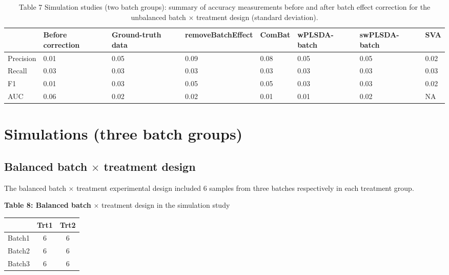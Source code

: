\documentclass[
]{book}
\begin{document}
\begin{table}

\caption{\label{tab:unnamed-chunk-122}Table 7 Simulation studies (two batch groups): summary of accuracy measurements before and after batch effect correction for the unbalanced batch × treatment design (standard deviation).}
\centering
\begin{tabular}[t]{l|l|l|l|l|l|l|l}
\hline
  & Before correction & Ground-truth data & removeBatchEffect & ComBat & wPLSDA-batch & swPLSDA-batch & SVA\\
\hline
Precision & 0.01 & 0.05 & 0.09 & 0.08 & 0.05 & 0.05 & 0.02\\
\hline
Recall & 0.03 & 0.03 & 0.03 & 0.03 & 0.03 & 0.03 & 0.03\\
\hline
F1 & 0.01 & 0.03 & 0.05 & 0.05 & 0.03 & 0.03 & 0.02\\
\hline
AUC & 0.06 & 0.02 & 0.02 & 0.01 & 0.01 & 0.02 & NA\\
\hline
\end{tabular}
\end{table}

\hypertarget{simulations-three-batch-groups}{%
\section{Simulations (three batch groups)}\label{simulations-three-batch-groups}}

\hypertarget{balanced-batch-times-treatment-design-2}{%
\subsection{\texorpdfstring{Balanced batch \(\times\) treatment design}{Balanced batch \textbackslash times treatment design}}\label{balanced-batch-times-treatment-design-2}}

The balanced batch \(\times\) treatment experimental design included 6 samples from three batches respectively in each treatment group.

\textbf{Table 8: Balanced batch} \(\times\) treatment design in the simulation study

\begin{longtable}[]{@{}ccc@{}}
\toprule()
& Trt1 & Trt2 \\
\midrule()
\endhead
Batch1 & 6 & 6 \\
Batch2 & 6 & 6 \\
Batch3 & 6 & 6 \\
\bottomrule()
\end{longtable}
\end{document}
